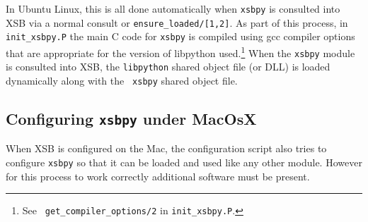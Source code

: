In Ubuntu Linux, this is all done automatically when {\tt xsbpy} is
consulted into XSB via a normal consult or {\tt ensure\_loaded/[1,2]}.
As part of this process, in {\tt init\_xsbpy.P} the main C code for
{\tt xsbpy} is compiled using gcc compiler options that are
appropriate for the version of libpython used.\footnote{See {\tt
    get\_compiler\_options/2} in {\tt init\_xsbpy.P}.}
When the {\tt xsbpy} module is consulted into XSB, the {\tt libpython}
shared object file (or DLL) is loaded dynamically along with the {\tt
  xsbpy} shared object file.

%
%


\noindent

\subsection{Configuring {\tt xsbpy} under MacOsX}

When XSB is configured on the Mac, the configuration script also tries
to configure {\tt xsbpy} so that it can be loaded and used like any
other module.  However for this process to work correctly additional
software must be present.

